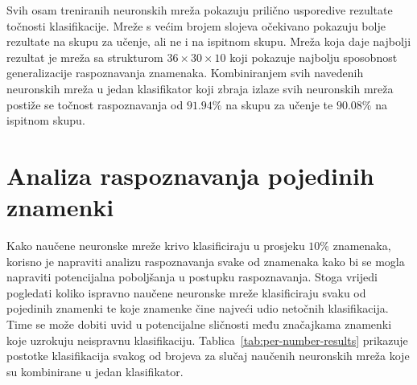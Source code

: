 \newline
Svih osam treniranih neuronskih mreža pokazuju prilično usporedive rezultate točnosti klasifikacije. Mreže s većim
brojem slojeva očekivano pokazuju bolje rezultate na skupu za učenje, ali ne i na ispitnom skupu. Mreža koja daje
najbolji rezultat je mreža sa strukturom $36 \times 30 \times 10$ koji pokazuje najbolju sposobnost generalizacije
raspoznavanja znamenaka. Kombiniranjem svih navedenih neuronskih mreža u jedan klasifikator koji zbraja izlaze svih
neuronskih mreža postiže se točnost raspoznavanja od $91.94\%$ na skupu za učenje te $90.08\%$ na ispitnom skupu.


\section{Analiza raspoznavanja pojedinih znamenki}
Kako naučene neuronske mreže krivo klasificiraju u prosjeku $10\%$ znamenaka, korisno je napraviti analizu raspoznavanja
svake od znamenaka kako bi se mogla napraviti potencijalna poboljšanja u postupku raspoznavanja. Stoga vrijedi
pogledati koliko ispravno naučene neuronske mreže klasificiraju svaku od pojedinih znamenki te koje znamenke čine
najveći udio netočnih klasifikacija. Time se može dobiti uvid u potencijalne sličnosti među značajkama znamenki koje
uzrokuju neispravnu klasifikaciju. Tablica\ \ref{tab:per-number-results} prikazuje postotke klasifikacija svakog od
brojeva za slučaj naučenih neuronskih mreža koje su kombinirane u jedan klasifikator.
